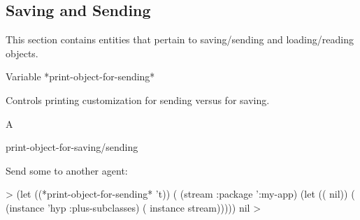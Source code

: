 \documentclass[10pt,twoside,english,pdftex]{article}
\begin{document}
\T\markright{}%
\T\pagestyle{plain}
\T\clearpage
\W{}
\T\pagestyle{fancy}
\T\thispagestyle{fancybottom}
\T\global\def\fnlastname{ }%

\subsection{Saving and Sending}
\label{sec:saving-sending}%

This section contains  entities that pertain to
saving/sending and loading/reading objects.

\W\entities
\T\clearpage


\begin{functiondoc}{Variable}%
{*print-object-for-sending*}{}%

\fnsyntax

\fnpurpose Controls \textbf{}
printing customization for sending versus for saving.

\fnpackage {}

\fnmodule {}

\fnvaluetype A 

\fninitialvalue \nil

\begin{alsos}{print-object-for-saving/sending}
\end{alsos}

\fnexample
{}%
%
%
%
Send some   to another agent:
%
\W\supp
\begin{example}
  > (let ((*print-object-for-sending* 't))
      ( (stream :package ':my-app)
        (let (( nil))
          ( (instance 'hyp :plus-subclasses)
            ( instance stream)))))
  nil
  >
\end{example}

\end{functiondoc}
\end{document}
